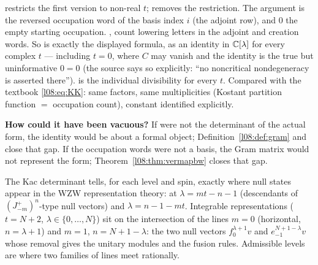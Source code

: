 \begin{dictionary}
 restricts the first version to non-real $t$;  removes the restriction. The
argument \allowbreak{}\allowbreak{}\allowbreak{}\allowbreak{} is the reversed occupation word of the basis index $i$
(the adjoint row), and $0$ the empty starting occupation. ,  count
lowering letters in the adjoint and creation words. So \allowbreak{}\allowbreak{}\allowbreak{}
is exactly the displayed formula, as an identity in ${\mathbb{C}}[\lambda]$ for every complex $t$ --- including $t=0$,
where $C$ may vanish and the identity is the true but uninformative $0=0$ (the source says so explicitly:
``no noncritical nondegeneracy is asserted there'').  is the individual divisibility
for every $t$. Compared with the textbook \eqref{l08:eq:KK}: same factors, same multiplicities
(Kostant partition function $=$ occupation count), constant identified explicitly.

\textbf{How could it have been vacuous?} If  were not the determinant of the actual
form, the identity would be about a formal object; Definition~\ref{l08:def:gram} and
\allowbreak{} close that gap. If the occupation words were not a basis, the Gram
matrix would not represent the form; Theorem~\ref{l08:thm:vermapbw} closes that gap.
\end{dictionary}

\begin{physics}
The Kac determinant tells, for each level and spin, exactly where null states appear in the WZW
representation theory: at $\lambda = mt-n-1$ (descendants of $(J^+_{-m})^n$-type null vectors) and
$\lambda = n-1-mt$. Integrable representations ($t=N+2$, $\lambda\in\{0,\ldots,N\}$) sit on the intersection of the
lines $m=0$ (horizontal, $n=\lambda+1$) and $m=1$, $n = N+1-\lambda$: the two null vectors $f_0^{\lambda+1}v$ and
$e_{-1}^{N+1-\lambda}v$ whose removal gives the unitary modules and the fusion rules. Admissible levels are
where two families of lines meet rationally.
\end{physics}

